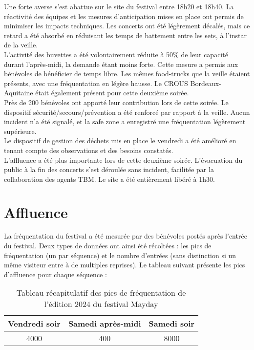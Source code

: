 \documentclass[12pt,a4paper]{report}
\begin{document}
Une forte averse s'est abattue sur le site du festival entre 18h20 et 18h40. La réactivité des équipes et les mesures d'anticipation mises en place ont permis de minimiser les impacts techniques. Les concerts ont été légèrement décalés, mais ce retard a été absorbé en réduisant les temps de battement entre les sets, à l'instar de la veille.\\

L'activité des buvettes a été volontairement réduite à 50\% de leur capacité durant l'après-midi, la demande étant moins forte. Cette mesure a permis aux bénévoles de bénéficier de temps libre. Les mêmes food-trucks que la veille étaient présents, avec une fréquentation en légère hausse. Le CROUS Bordeaux-Aquitaine était également présent pour cette deuxième soirée.\\

Près de 200 bénévoles ont apporté leur contribution lors de cette soirée. Le dispositif sécurité/secours/prévention a été renforcé par rapport à la veille. Aucun incident n'a été signalé, et la safe zone a enregistré une fréquentation légèrement supérieure.\\

Le dispositif de gestion des déchets mis en place le vendredi a été amélioré en tenant compte des observations et des besoins constatés.\\

L'affluence a été plus importante lors de cette deuxième soirée. L'évacuation du public à la fin des concerts s'est déroulée sans incident, facilitée par la collaboration des agents TBM. Le site a été entièrement libéré à 1h30.

\section{Affluence}
La fréquentation du festival a été mesurée par des bénévoles postés après l'entrée du festival. Deux types de données ont ainsi été récoltées : les pics de fréquentation (un par séquence) et le nombre d'entrées (sans distinction si un même visiteur entre à de multiples reprises). Le tableau suivant présente les pics d'affluence pour chaque séquence :
\begin{table}[h!]
\centering
\begin{tabular}{|c|c|c|}
\hline
Vendredi soir & Samedi après-midi & Samedi soir \\
\hline
4000 & 400 & 8000\\
\hline
\end{tabular}
\caption{Tableau récapitulatif des pics de fréquentation de l'édition 2024 du festival Mayday}
\end{table}
\end{document}
